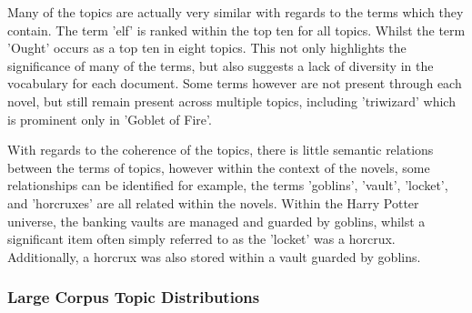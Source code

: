 \documentclass[10pt]{report}
\begin{document}
Many of the topics are actually very similar with regards to the terms which they contain. The term 'elf' is ranked within the top ten for all topics. Whilst the term 'Ought' occurs as a top ten in eight topics.  This not only highlights the significance of many of the terms, but also suggests a lack of diversity in the vocabulary for each document. Some terms however are not present through each novel, but still remain present across multiple topics, including 'triwizard' which is prominent only in 'Goblet of Fire'.

With regards to the coherence of the topics, there is little semantic relations between the terms of topics, however within the context of the novels, some relationships can be identified for example, the terms 'goblins', 'vault', 'locket', and 'horcruxes' are all related within the novels. Within the Harry Potter universe, the banking vaults are managed and guarded by goblins, whilst a significant item often simply referred to as the 'locket' was a horcrux. Additionally, a horcrux was also stored within a vault guarded by goblins. 

\clearpage
\subsubsection{Large Corpus Topic Distributions}
\end{document}
